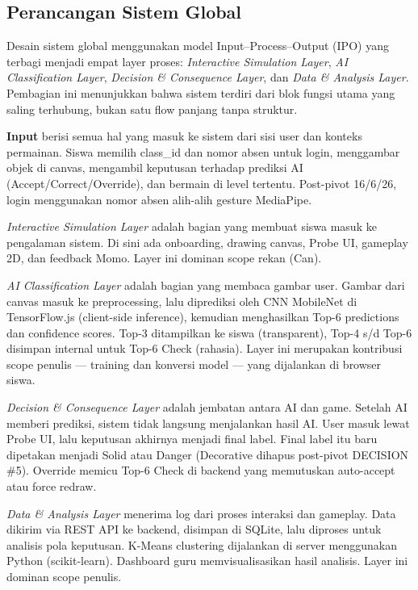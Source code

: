 \documentclass[12pt,a4paper,oneside,openany]{report}
\begin{document}
\subsection{Perancangan Sistem Global}
\label{subsec:sistem-global}

Desain sistem global menggunakan model Input--Process--Output (IPO) yang terbagi menjadi empat layer proses: \textit{Interactive Simulation Layer}, \textit{AI Classification Layer}, \textit{Decision \& Consequence Layer}, dan \textit{Data \& Analysis Layer}. Pembagian ini menunjukkan bahwa sistem terdiri dari blok fungsi utama yang saling terhubung, bukan satu flow panjang tanpa struktur.

\textbf{Input} berisi semua hal yang masuk ke sistem dari sisi user dan konteks permainan. Siswa memilih class\_id dan nomor absen untuk login, menggambar objek di canvas, mengambil keputusan terhadap prediksi AI (Accept/Correct/Override), dan bermain di level tertentu. Post-pivot 16/6/26, login menggunakan nomor absen alih-alih gesture MediaPipe.

\textit{Interactive Simulation Layer} adalah bagian yang membuat siswa masuk ke pengalaman sistem. Di sini ada onboarding, drawing canvas, Probe UI, gameplay 2D, dan feedback Momo. Layer ini dominan scope rekan (Can).

\textit{AI Classification Layer} adalah bagian yang membaca gambar user. Gambar dari canvas masuk ke preprocessing, lalu diprediksi oleh CNN MobileNet di TensorFlow.js (client-side inference), kemudian menghasilkan Top-6 predictions dan confidence scores. Top-3 ditampilkan ke siswa (transparent), Top-4 s/d Top-6 disimpan internal untuk Top-6 Check (rahasia). Layer ini merupakan kontribusi scope penulis --- training dan konversi model --- yang dijalankan di browser siswa.

\textit{Decision \& Consequence Layer} adalah jembatan antara AI dan game. Setelah AI memberi prediksi, sistem tidak langsung menjalankan hasil AI. User masuk lewat Probe UI, lalu keputusan akhirnya menjadi final label. Final label itu baru dipetakan menjadi Solid atau Danger (Decorative dihapus post-pivot DECISION \#5). Override memicu Top-6 Check di backend yang memutuskan auto-accept atau force redraw.

\textit{Data \& Analysis Layer} menerima log dari proses interaksi dan gameplay. Data dikirim via REST API ke backend, disimpan di SQLite, lalu diproses untuk analisis pola keputusan. K-Means clustering dijalankan di server menggunakan Python (scikit-learn). Dashboard guru memvisualisasikan hasil analisis. Layer ini dominan scope penulis.
\end{document}
